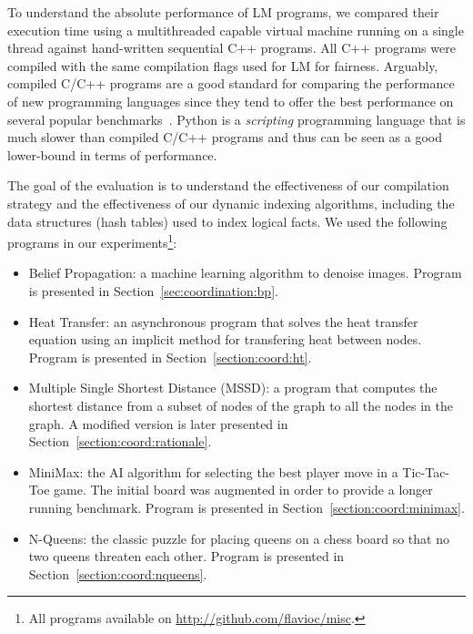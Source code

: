To understand the absolute performance of LM programs, we compared their
execution time using a multithreaded capable virtual machine running on a single
thread against hand-written sequential C++ programs. All C++ programs were
compiled with the same compilation flags used for LM for fairness. Arguably,
compiled C/C++ programs are a good standard for comparing the performance of new
programming languages since they tend to offer the best performance on several
popular benchmarks~\cite{language_benchmarks}.  Python is a \emph{scripting}
programming language that is much slower than compiled C/C++ programs and thus
can be seen as a good lower-bound in terms of performance.

The goal of the evaluation is to understand the effectiveness of our compilation
strategy and the effectiveness of our dynamic indexing algorithms, including the
data structures (hash tables) used to index logical facts. We used the following
programs in our experiments\footnote{All programs available on
   \url{http://github.com/flavioc/misc}.}:

\begin{itemize}
   \item Belief Propagation: a machine learning algorithm to denoise images. Program is
      presented in Section~\ref{sec:coordination:bp}.

   \item Heat Transfer: an asynchronous program that solves the heat transfer
      equation using an implicit method for transfering heat between nodes.
      Program is presented in Section~\ref{section:coord:ht}.

   \item Multiple Single Shortest Distance (MSSD): a program that computes the
      shortest distance from a subset of nodes of the graph to all the nodes in
      the graph. A modified version is later presented in
      Section~\ref{section:coord:rationale}.

    \item MiniMax: the AI algorithm for selecting the best player move in a
       Tic-Tac-Toe game. The initial board was augmented in order to provide a
       longer running benchmark. Program is presented in
       Section~\ref{section:coord:minimax}.


   \item N-Queens: the classic puzzle for placing queens on a chess board so
      that no two queens threaten each other. Program is presented in
      Section~\ref{section:coord:nqueens}.

\end{itemize}

